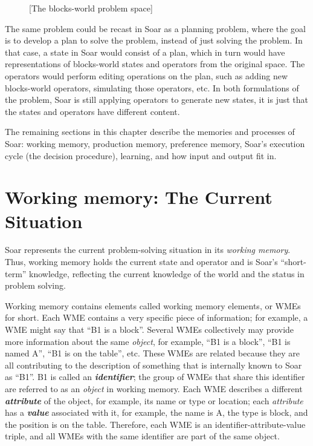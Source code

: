 \begin{figure}
	[The blocks-world problem space]
	\label{fig:blocks-ps}
\end{figure}

The same problem could be recast in Soar as a planning problem, where the goal is to develop a plan to solve the problem, instead of just solving the problem.  In that case, a state in Soar would consist of a plan, which in turn would have representations of blocks-world states and operators from the original space.  The operators would perform editing operations on the plan, such as adding new blocks-world operators, simulating those operators, etc.  In both formulations of the problem, Soar is still applying operators to generate new states, it is just that the states and operators have different content.

The remaining sections in this chapter describe the memories and processes of Soar: working memory, production memory, preference memory, Soar's execution cycle (the decision procedure), learning, and how  input and output fit in.


\section{Working memory: The Current Situation} 
\label{ARCH-wm}

Soar represents the current problem-solving situation in its \emph{working memory}. Thus, working memory holds the current state and operator and is Soar's ``short-term'' knowledge, reflecting the current knowledge of the world and the status in problem solving.

Working memory contains elements called working memory elements, or WMEs for short. Each WME contains a very specific piece of information; for example, a WME might say that ``B1 is a block''.  Several WMEs collectively may provide more information about the same \textit{object}, for example, ``B1 is a block'', ``B1 is named A'', ``B1 is on the table'', etc. These WMEs are related because they are all contributing to the description of something that is internally known to Soar as ``B1''. B1 is called an \textbf{\textit{identifier}}; the group of WMEs that share this identifier are referred to as an \textit{object} in working memory.  Each WME describes a different \textbf{\textit{attribute}} of the object, for example, its name or type or location; each \textit{attribute} has a \textbf{\textit{value}} associated with it, for example, the name is A, the type is block, and the position is on the table. Therefore, each WME is an identifier-attribute-value triple, and all WMEs with the same identifier are part of the same object. 

